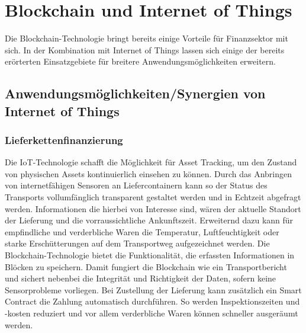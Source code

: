 \section{Blockchain und Internet of Things}
Die Blockchain-Technologie bringt bereits einige Vorteile für Finanzsektor mit sich.
In der Kombination mit Internet of Things lassen sich einige der bereits erörterten Einsatzgebiete
für breitere Anwendungsmöglichkeiten erweitern.

\subsection{Anwendungsmöglichkeiten/Synergien von Internet of Things}

\subsubsection{Lieferkettenfinanzierung}
Die IoT-Technologie schafft die Möglichkeit für Asset Tracking, um den Zustand von physischen Assets
kontinuierlich einsehen zu können. Durch das Anbringen von internetfähigen Sensoren an 
Liefercontainern kann so der Status des Transports vollumfänglich transparent gestaltet
werden und in Echtzeit abgefragt werden. 
Informationen die hierbei von Interesse sind, wären der aktuelle Standort der Lieferung und
die vorraussichtliche Ankunftszeit. Erweiternd dazu kann für empfindliche und 
verderbliche Waren die Temperatur, Luftfeuchtigkeit oder starke Erschütterungen auf dem 
Transportweg aufgezeichnet werden.
Die Blockchain-Technologie bietet die Funktionalität, die erfassten Informationen in Blöcken
zu speichern. Damit fungiert die Blockchain wie ein Transportbericht und sichert nebenbei die 
Integrität und Richtigkeit der Daten, sofern keine Sensorprobleme vorliegen. 
Bei Zustellung der Lieferung kann zusätzlich ein Smart Contract die Zahlung automatisch durchführen.
So werden Inspektionszeiten und -kosten reduziert und vor allem verderbliche Waren können schneller
ausgeräumt werden.
\cite[p.~169f]{chowdhary2025smart}
